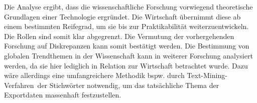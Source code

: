 Die Analyse ergibt, dass die wissenschaftliche Forschung vorwiegend theoretische Grundlagen einer Technologie ergründet. Die Wirtschaft übernimmt diese ab einem bestimmten Reifegrad, um sie bis zur Praktikabilität weiterzuentwickeln. Die Rollen sind somit klar abgegrenzt. Die Vermutung der vorhergehenden Forschung auf Diskrepanzen kann somit bestätigt werden. Die Bestimmung von globalen Trendthemen in der Wissenschaft kann in weiterer Forschung analysiert werden, da sie hier lediglich in Relation zur Wirtschaft betrachtet wurde. Dazu wäre allerdings eine umfangreichere Methodik bspw. durch \glqq Text-Mining-Verfahren\grqq~der Stichwörter notwendig, um das tatsächliche Thema der Exportdaten massenhaft festzustellen.